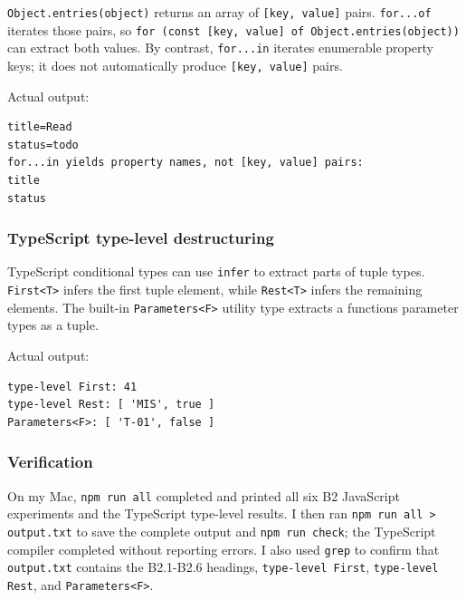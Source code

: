 \documentclass[
]{article}
\newcommand{\passthrough}[1]{#1}
\begin{document}
\passthrough{\lstinline!Object.entries(object)!} returns an array of
\passthrough{\lstinline![key, value]!} pairs.
\passthrough{\lstinline!for...of!} iterates those pairs, so
\passthrough{\lstinline!for (const [key, value] of Object.entries(object))!}
can extract both values. By contrast, \passthrough{\lstinline!for...in!}
iterates enumerable property keys; it does not automatically produce
\passthrough{\lstinline![key, value]!} pairs.

Actual output:

\begin{lstlisting}
title=Read
status=todo
for...in yields property names, not [key, value] pairs:
title
status
\end{lstlisting}

\subsubsection{TypeScript type-level
destructuring}\label{typescript-type-level-destructuring}

TypeScript conditional types can use \passthrough{\lstinline!infer!} to
extract parts of tuple types. \passthrough{\lstinline!First<T>!} infers
the first tuple element, while \passthrough{\lstinline!Rest<T>!} infers
the remaining elements. The built-in
\passthrough{\lstinline!Parameters<F>!} utility type extracts a
function\textquotesingle s parameter types as a tuple.

Actual output:

\begin{lstlisting}
type-level First: 41
type-level Rest: [ 'MIS', true ]
Parameters<F>: [ 'T-01', false ]
\end{lstlisting}

\subsubsection{Verification}\label{verification}

On my Mac, \passthrough{\lstinline!npm run all!} completed and printed
all six B2 JavaScript experiments and the TypeScript type-level results.
I then ran \passthrough{\lstinline!npm run all > output.txt!} to save
the complete output and \passthrough{\lstinline!npm run check!}; the
TypeScript compiler completed without reporting errors. I also used
\passthrough{\lstinline!grep!} to confirm that
\passthrough{\lstinline!output.txt!} contains the B2.1-B2.6 headings,
\passthrough{\lstinline!type-level First!},
\passthrough{\lstinline!type-level Rest!}, and
\passthrough{\lstinline!Parameters<F>!}.
\end{document}
